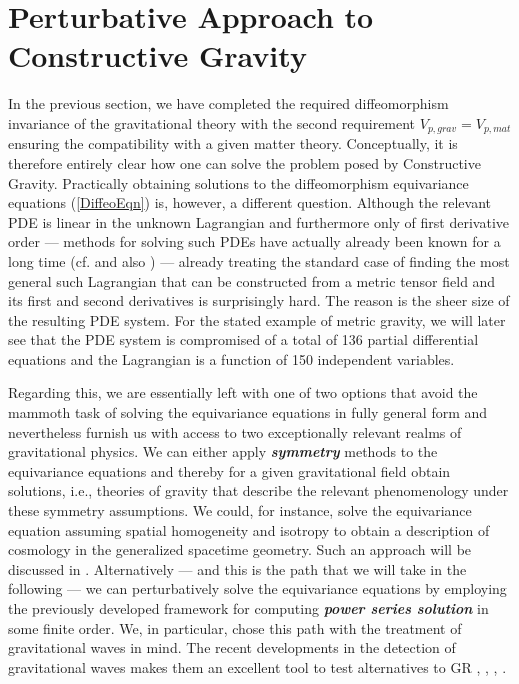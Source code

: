 \section{Perturbative Approach to Constructive Gravity}
In the previous section, we have completed the required diffeomorphism invariance of the gravitational theory with the second requirement $V_{p,grav}=V_{p,mat}$ ensuring the compatibility with a given matter theory. Conceptually, it is therefore entirely clear how one can solve the problem posed by Constructive Gravity. Practically obtaining solutions to the diffeomorphism equivariance equations (\ref{DiffeoEqn}) is, however, a different question. Although the relevant PDE is linear in the unknown Lagrangian and furthermore only of first derivative order --- methods for solving  such PDEs have actually already been known for a long time (cf. \cite{Hilbert} and also \cite{Han2015}) --- already treating the standard case of finding the most general such Lagrangian that can be constructed from a metric tensor field and its first and second derivatives is surprisingly hard. The reason is the sheer size of the resulting PDE system. For the stated example of metric gravity, we will later see that the PDE system is compromised of a total of 136 partial differential equations and the Lagrangian is a function of 150 independent variables.  

Regarding this, we are essentially left with one of two options that avoid the mammoth task of solving the equivariance equations in fully general form and nevertheless furnish us with access to two exceptionally relevant realms of gravitational physics. We can either apply \textbf{\textit{symmetry}} methods to the equivariance equations and thereby for a given gravitational field obtain solutions, i.e., theories of gravity that describe the relevant phenomenology under these symmetry assumptions. We could, for instance, solve the equivariance equation assuming spatial homogeneity and isotropy to obtain a description of cosmology in the generalized spacetime geometry.
Such an approach will be discussed in \cite{NilsPHD}.
Alternatively --- and this is the path that we will take in the following --- we can perturbatively solve the equivariance equations by employing the previously developed framework for computing \textit{\textbf{power series solution}} in some finite order. We, in particular, chose this path with the treatment of gravitational waves in mind.  The recent developments in the detection of gravitational waves makes them an excellent tool to test alternatives to GR \cite{2010PhRvD..81f4008Y}, \cite{2011PhRvD..83j4022B}, \cite{2017PhRvD..95j4027Z}, \cite{2013LRR....16....9Y}.

